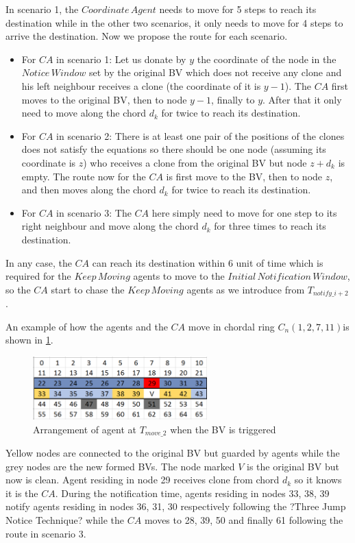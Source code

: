 In scenario 1, the $Coordinate\,Agent$ needs to move for 5 steps to reach its destination while in the other two scenarios, it only needs to move for 4 steps to arrive the destination. Now we propose the route for each scenario.
\begin{itemize}
\item For $CA$ in scenario 1: Let us donate by $y$ the coordinate of the node in the $Notice\,Window$ set by the original BV which does not receive any clone and his left neighbour receives a clone (the coordinate of it is $y-1$). The $CA$ first moves to the original BV, then to node $y-1$, finally to $y$. After that it only need to move along the chord $d_k$ for twice to reach its destination.
\item For $CA$ in scenario 2: There is at least one pair of the positions of the clones does not satisfy the equations so there should be one node (assuming its coordinate is $z$) who receives a clone from the original BV but node $z+d_k$ is empty. The route now for the $CA$ is first move to the BV, then to node $z$, and then moves along the chord $d_k$ for twice to reach its destination.
\item For $CA$ in scenario 3: The $CA$ here simply need to move for one step to its right neighbour and move along the chord $d_k$ for three times to reach its destination.
\end{itemize}

In any case, the $CA$ can reach its destination within 6 unit of time which is required for the $Keep\,Moving$ agents to move to the $Initial\,Notification\,Window$, so the $CA$ start to chase the $Keep\,Moving$ agents as we introduce from $T_{notify\_{i+2}}$. 

An example of how the agents and the $CA$ move in chordal ring $C_n(1, 2, 7, 11)$is shown in \ref{fig:T29}. 
\begin{figure}[H]
  \centering  
  \includegraphics[width=0.6\textwidth]{figures/T29.png}
  \caption{Arrangement of agent at $T_{move\_2}$ when the BV is triggered}\label{fig:T29}
\end{figure}

Yellow nodes are connected to the original BV but guarded by agents while the grey nodes are the new formed BVs. The node marked $V$ is the original BV but now is clean. Agent residing in node 29 receives clone from chord $d_k$ so it knows it is the $CA$. During the notification time, agents residing in nodes 33, 38, 39 notify agents residing in nodes 36, 31, 30 respectively following the ?Three Jump Notice Technique? while the $CA$ moves to 28, 39, 50 and finally 61 following the route in scenario 3.

